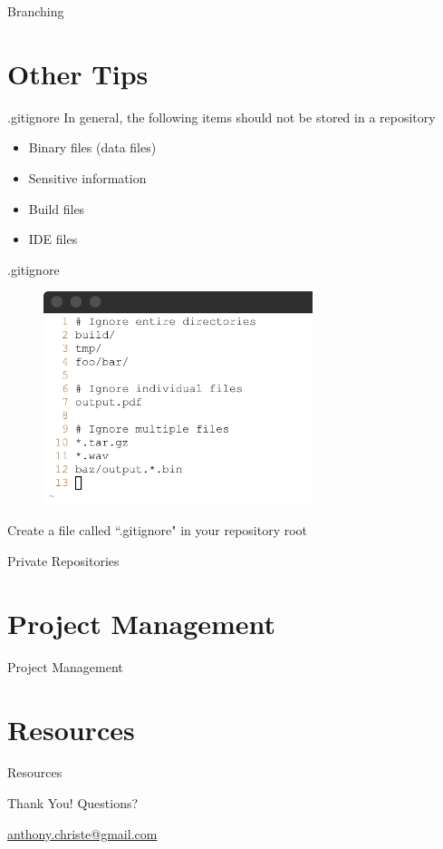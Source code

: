 \documentclass{beamer}
\begin{document}
    \begin{frame}{Branching}
    \end{frame}

    \section{Other Tips}
    \begin{frame}{.gitignore}
        In general, the following items should not be stored in a repository
        \begin{itemize}
            \item Binary files (data files)
            \item Sensitive information
            \item Build files
            \item IDE files
        \end{itemize}
    \end{frame}

    \begin{frame}{.gitignore}
        \begin{figure}
            \centering
            \includegraphics[width=0.7\textwidth]{figures/gitignore.png}
        \end{figure}
        \centering
        Create a file called ``.gitignore" in your repository root
    \end{frame}

    \begin{frame}{Private Repositories}
    \end{frame}

    \section{Project Management}
    \begin{frame}{Project Management}
    \end{frame}

    \section{Resources}
    \begin{frame}{Resources}
    \end{frame}

    \begin{frame}{Thank You!}
        \centering
        Questions?

        \href{mailto:anthony.christe@gmail.com}{anthony.christe@gmail.com}
    \end{frame}
\end{document}
